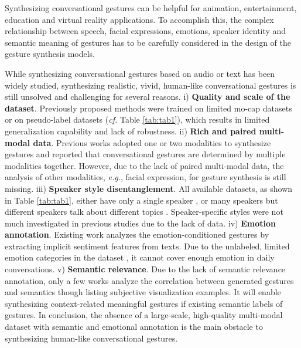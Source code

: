 \documentclass[runningheads]{llncs}
\begin{document}
Synthesizing conversational gestures can be helpful for animation, entertainment, education and virtual reality applications. To accomplish this, the complex relationship between speech, facial expressions, emotions, speaker identity and semantic meaning of gestures has to be carefully considered in the design of the gesture synthesis models.  

While synthesizing conversational gestures based on audio \cite{li2021audio2gestures,yoon2020speech,ginosar2019learning} or text \cite{yoon2019robots,bhattacharya2021text2gestures,ali2020automatic,alexanderson2020generating} has been widely studied, synthesizing realistic, vivid, human-like conversational gestures is still unsolved and challenging for several reasons. 
i) \textbf{Quality and scale of the dataset}. 
Previously proposed methods \cite{yoon2020speech,li2021audio2gestures} were trained on limited mo-cap datasets \cite{takeuchi2017creating,ferstl2018investigating} or on pseudo-label \cite{ginosar2019learning,yoon2020speech,habibie2021learning} datasets (\textit{cf.} Table \ref{tab:tab1}), which results in limited generalization capability and lack of robustness.
ii) \textbf{Rich and paired multi-modal data}. Previous works adopted one or two modalities \cite{ginosar2019learning,yoon2019robots,yoon2020speech} to synthesize gestures and reported that conversational gestures are determined by multiple modalities together. However, due to the lack of paired multi-modal data, the analysis of other modalities, \textit{e.g.}, facial expression, for gesture synthesis is still missing. 
iii) \textbf{Speaker style disentanglement}. All available datasets, as shown in Table \ref{tab:tab1}, either have only a single speaker \cite{ferstl2018investigating}, or many speakers but different speakers talk about different topics \cite{habibie2021learning,yoon2020speech,ginosar2019learning}. Speaker-specific styles were not much investigated in previous studies due to the lack of data. 
iv) \textbf{Emotion annotation}. Existing work \cite{bhattacharya2021speech2affectivegestures} analyzes the emotion-conditioned gestures by extracting implicit sentiment features from texts. Due to the unlabeled, limited emotion categories in the dataset \cite{yoon2020speech}, it cannot cover enough emotion in daily conversations.  
v) \textbf{Semantic relevance}. Due to the lack of semantic relevance annotation, only a few works \cite{kucherenko2020gesticulator,yoon2020speech} analyze the correlation between generated gestures and semantics though listing subjective visualization examples. It will enable synthesizing context-related meaningful gestures if existing semantic labels of gestures.
In conclusion, the absence of a large-scale, high-quality multi-modal dataset with semantic and emotional annotation is the main obstacle to synthesizing human-like conversational gestures.
 
\end{document}
